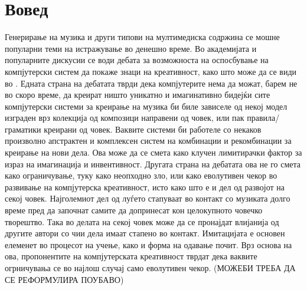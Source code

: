 \chapter{Вовед}

Генерирање на музика и други типови на мултимедиска содржина се мошне популарни теми на истражување во денешно време. Во академијата и популарните дискусии се води дебата за возможноста на оспосбување на компјутерски систем да покаже знаци на креативност, како што може да се види во \cite{Ghedini2015}. Едната страна на дебатата тврди дека компјутерите нема да можат, барем не во скоро време, да креират ништо уникатно и имагинативно бидејќи сите компјутерски системи за креирање на музика би биле зависеле од некој модел изграден врз колекција од композици направени од човек, или пак правила/граматики креирани од човек. Ваквите системи би работеле со некаков произволно апстрактен и комплексен систем на комбинации и рекомбинации за креирање на нови дела. Ова може да се смета како клучен лимитирачки фактор за израз на имагинација и инвентивност. Другата страна на дебатата ова не го смета како ограничување, туку како неопходно зло, или како еволутивен чекор во развивање на компјутерска креативност, исто како што е и дел од развојот на секој човек. Најголемиот дел од луѓето стапуваат во контакт со музиката долго време пред да започнат самите да допринесат кон целокупното човечко творештво. Така во делата на секој човек може да се пронајдат влијанија од другите автори со чии дела имаат стапено во контакт. Имитацијата е основен елеменет во процесот на учење, како и форма на одавање почит. Врз основа на ова, пропонентите на компјутерската креативност тврдат дека ваквите огрничувања се во најлош случај само еволутивен чекор. (МОЖЕБИ ТРЕБА ДА СЕ РЕФОРМУЛИРА ПОУБАВО)

